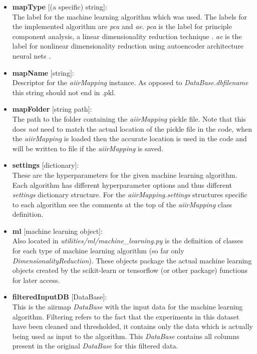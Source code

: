 \documentclass[a4paper,12pt,english]{article}
\begin{document}
    \begin{itemize}
    \item \textbf{mapType} [(a specific) string]:\\
    The label for the machine learning algorithm which was used. The labels for the implemented algorithm are \textit{pca} and \textit{ae}. \textit{pca} is the label for principle component analysis, a linear dimensionality reduction technique \cite{pca1, pca2}. \textit{ae} is the label for nonlinear dimensionality reduction using autoencoder architecture neural nets \cite{ae}.
    \item \textbf{mapName} [string]:\\
    Descriptor for the \textit{aiirMapping} instance. As opposed to \textit{DataBase.dbfilename} this string should not end in .pkl. 
    \item \textbf{mapFolder} [string path]:\\
    The path to the folder containing the \textit{aiirMapping} pickle file. Note that this does \textit{not} need to match the actual location of the pickle file in the code, when the \textit{aiirMapping} is loaded then the accurate location is used in the code and will be written to file if the \textit{aiirMapping} is saved. 
    \item \textbf{settings} [dictionary]:\\
    These are the hyperparameters for the given machine learning algorithm. Each algorithm has different hyperparameter options and thus different \textit{settings} dictionary structure. For the \textit{aiirMapping.settings} structures specific to each algorithm see the comments at the top of the \textit{aiirMapping} class definition.
    \item \textbf{ml} [machine learning object]:\\
    Also located in \textit{utilities/ml/machine\_learning.py} is the definition of classes for each type of machine learning algorithm (so far only \textit{DimensionalityReduction}). These objects package the actual machine learning objects created by the scikit-learn or tensorflow (or other package) functions for later access.
    \item \textbf{filteredInputDB} [DataBase]:\\
    This is the aiirmap \textit{DataBase} with the input data for the machine learning algorithm. Filtering refers to the fact that the experiments in this dataset have been cleaned and thresholded, it contains only the data which is actually being used as input to the algorithm. This \textit{DataBase} contains all columns present in the original \textit{DataBase} for this filtered data.

\end{itemize}
\end{document}
